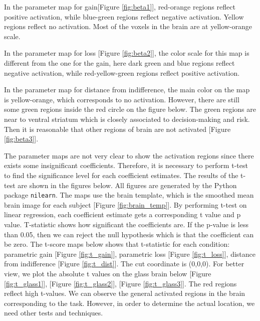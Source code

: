 
\par \indent In the parameter map for gain[Figure \ref{fig:beta1}], red-orange regions reflect positive activation, while blue-green regions reflect negative activation. Yellow regions reflect no activation. Most of the voxels in the brain are at yellow-orange scale.

\par \indent In the parameter map for loss [Figure \ref{fig:beta2}],  the color scale for this map is different from the one for the gain, here dark green and blue regions reflect negative activation, while red-yellow-green regions reflect positive activation. 

\par \indent In the parameter map for distance from indifference, the main color on the map is yellow-orange, which corresponds to no activation. However, there are still some green regions inside the red circle on the figure below. The green regions are near to ventral striatum which is closely associated to decision-making and risk. Then it is reasonable that other regions of brain are not activated [Figure \ref{fig:beta3}].

\par \indent The parameter maps are not very clear to show the activation regions since there exists some insignificant coefficients. Therefore, it is necessary to perform t-test to find the significance level for each coefficient estimates. The results of the t-test are shown in the figures below. All figures are generated by the Python package \texttt{nilearn}. The maps use the brain template, which is the smoothed mean brain image for each subject [Figure \ref{fig:brain_temp}]. By performing t-test on linear regression, each coefficient estimate gets a corresponding t value and p value. T-statistic shows how significant the coefficients are. If the p-value is less than 0.05, then we can reject the null hypothesis which is that the coefficient can be zero. The t-score maps below shows that t-statistic for each condition: parametric gain [Figure \ref{fig:t_gain}], parametric loss [Figure \ref{fig:t_loss}], distance from indifference [Figure \ref{fig:t_dist}]. The cut coordinate is (0,0,0). For better view, we plot the absolute t values on the glass brain below [Figure \ref{fig:t_glass1}], [Figure \ref{fig:t_glass2}], [Figure \ref{fig:t_glass3}]. The red regions reflect high t-values. We can observe the general activated regions in the brain corresponding to the task. However, in order to determine the actual location, we need other tests and techniques.

